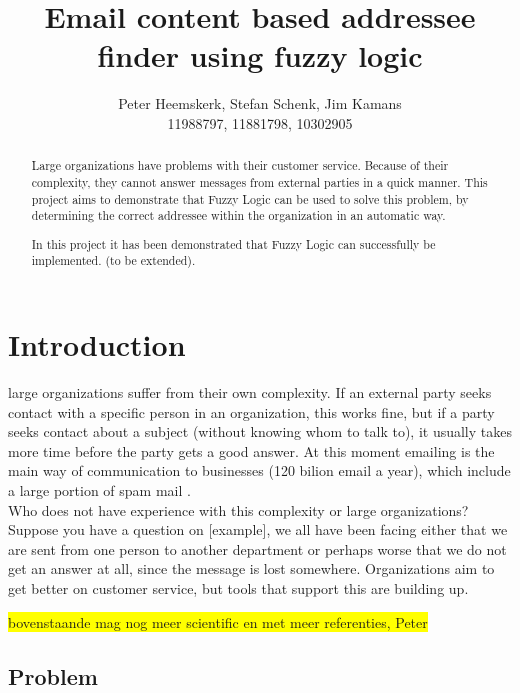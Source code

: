 \documentclass[journal]{IEEEtran}
\begin{document}
\title{Email content based addressee finder using fuzzy logic}
\author{Peter Heemskerk, Stefan Schenk, Jim Kamans\\11988797, 11881798, 10302905}


\maketitle

\begin{abstract}
Large organizations have problems with their customer service. 
Because of their complexity, they cannot answer messages from external parties in a quick manner. This project aims to demonstrate that Fuzzy Logic can be used to solve this problem, by determining the correct addressee within the organization in an automatic way.

In this project it has been demonstrated that Fuzzy Logic can successfully be implemented. (to be extended).
\end{abstract}

\section{Introduction}
 large organizations suffer from their own complexity. If an external party seeks contact with a specific person in an organization, this works fine, but if a party seeks contact about a subject (without knowing whom to talk to), it usually takes more time before the party gets a good answer. At this moment emailing is the main way of communication to businesses (120 bilion email a year), which include a large portion of spam mail \cite{email_statistics}.\\

Who does not have experience with this complexity or large organizations? Suppose you have a question on [example], we all have been facing either that we are sent from one person to another department or perhaps worse that we do not get an answer at all, since the message is lost somewhere. Organizations aim to get better on customer service, but tools that support this are building up. 

\colorbox{yellow}{bovenstaande mag nog meer scientific en met meer referenties, Peter}

\subsection{Problem}
\end{document}
